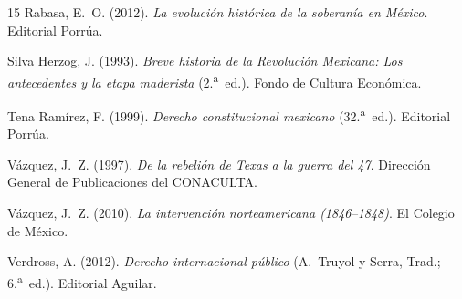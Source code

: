 \documentclass[12pt,spanish,letterpaper,oneside]{article}
\begin{document}
\begin{thebibliography}{15}
Rabasa, E.~O. (2012). \emph{La evoluci\'on hist\'orica de la soberan\'ia en M\'exico}. Editorial Porr\'ua.

Silva Herzog, J. (1993). \emph{Breve historia de la Revoluci\'on Mexicana: Los antecedentes y la etapa maderista} (2.\textsuperscript{a}~ed.). Fondo de Cultura Econ\'omica.

Tena Ram\'irez, F. (1999). \emph{Derecho constitucional mexicano} (32.\textsuperscript{a}~ed.). Editorial Porr\'ua.

V\'azquez, J.~Z. (1997). \emph{De la rebeli\'on de Texas a la guerra del 47}. Direcci\'on General de Publicaciones del CONACULTA.

V\'azquez, J.~Z. (2010). \emph{La intervenci\'on norteamericana (1846--1848)}. El Colegio de M\'exico.

Verdross, A. (2012). \emph{Derecho internacional p\'ublico} (A.~Truyol y Serra, Trad.; 6.\textsuperscript{a}~ed.). Editorial Aguilar.

\end{thebibliography}
\end{document}
